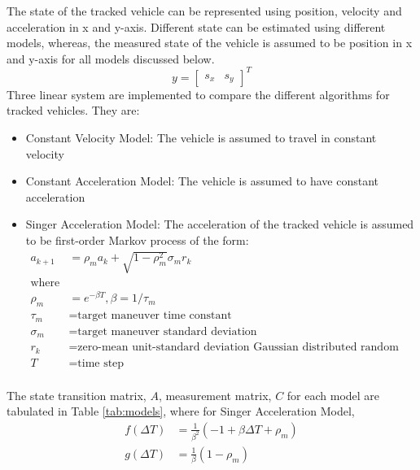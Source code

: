 The state of the tracked vehicle can be represented using position, velocity and acceleration in x and y-axis. Different state can be estimated using different models, whereas, the measured state of the vehicle is assumed to be position in x and y-axis for all models discussed below.
\begin{equation*}
y =[ 
\begin{matrix}
s_x & s_y
\end{matrix}
]^T
\end{equation*}
Three linear system are implemented to compare the different algorithms for tracked vehicles. They are:
\begin{itemize}
\item Constant Velocity Model: The vehicle is assumed to travel in constant velocity
\item Constant Acceleration Model: The vehicle is assumed to have constant acceleration
\item Singer Acceleration Model: The acceleration of the tracked vehicle is assumed to be first-order Markov process of the form:
\begin{equation}
\begin{split}
a_{k+1} & = \rho_m a_k + \sqrt{1- \rho_m^2} \sigma_m r_k\\
\text{where}\\
\rho_m &= e^{-\beta T}, \beta = 1/\tau_m\\
\tau_m &= \text{target maneuver time constant}\\
\sigma_m &= \text{target maneuver standard deviation}\\
r_k &= \text{zero-mean unit-standard deviation Gaussian distributed random variable}\\
T &= \text{time step}\\
\end{split}
\end{equation}
\end{itemize}
The state transition matrix, $A$, measurement matrix, $C$ for each model are tabulated in Table \ref{tab:models}, where for Singer Acceleration Model,
\begin{equation}
\label{eq:singermodel}
\begin{split}
f(\Delta T) &= \frac{1}{\beta^2}(-1+\beta\Delta T+\rho_m)\\
g(\Delta T) &= \frac{1}{\beta} (1- \rho_m)
\end{split}
\end{equation}
